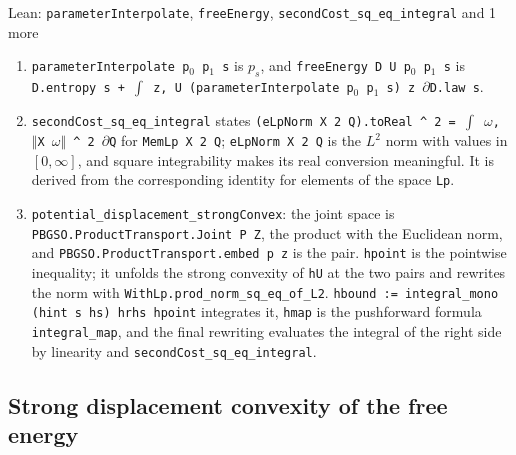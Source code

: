 \documentclass[11pt,a4paper]{report}
\begin{document}
\begin{leanbox}{Lean: \texttt{parameterInterpolate}, \texttt{freeEnergy}, \texttt{secondCost\_\allowbreak{}sq\_\allowbreak{}eq\_\allowbreak{}integral} and 1 more}
\begin{enumerate}
\item \texttt{parameter\allowbreak{}Interpolate p\ensuremath{{}_{0}} p\ensuremath{{}_{1}} s} is \(p_s\), and \texttt{free\allowbreak{}Energy D U p\ensuremath{{}_{0}} p\ensuremath{{}_{1}} s} is \texttt{D.\allowbreak{}entropy s + \ensuremath{\int} z, U (parameter\allowbreak{}Interpolate p\ensuremath{{}_{0}} p\ensuremath{{}_{1}} s) z \ensuremath{\partial}D.\allowbreak{}law s}.

\item \texttt{second\allowbreak{}Cost\_\allowbreak{}sq\_\allowbreak{}eq\_\allowbreak{}integral} states \texttt{(e\allowbreak{}Lp\allowbreak{}Norm X 2 Q).\allowbreak{}to\allowbreak{}Real \textasciicircum{} 2 = \ensuremath{\int} \ensuremath{\omega}, \ensuremath{\Vert}X \ensuremath{\omega}\ensuremath{\Vert} \textasciicircum{} 2 \ensuremath{\partial}Q} for \texttt{Mem\allowbreak{}Lp X 2 Q}; \texttt{e\allowbreak{}Lp\allowbreak{}Norm X 2 Q} is the \(L^2\) norm with values in \([0,\infty]\), and square integrability makes its real conversion meaningful. It is derived from the corresponding identity for elements of the space \texttt{Lp}.

\item \texttt{potential\_\allowbreak{}displacement\_\allowbreak{}strong\allowbreak{}Convex}: the joint space is \texttt{PBGSO.\allowbreak{}Product\allowbreak{}Transport.\allowbreak{}Joint P Z}, the product with the Euclidean norm, and \texttt{PBGSO.\allowbreak{}Product\allowbreak{}Transport.\allowbreak{}embed p z} is the pair. \texttt{hpoint} is the pointwise inequality; it unfolds the strong convexity of \texttt{h\allowbreak{}U} at the two pairs and rewrites the norm with \texttt{With\allowbreak{}Lp.\allowbreak{}prod\_\allowbreak{}norm\_\allowbreak{}sq\_\allowbreak{}eq\_\allowbreak{}of\_\allowbreak{}L2}. \texttt{hbound := integral\_\allowbreak{}mono (hint s hs) hrhs hpoint} integrates it, \texttt{hmap} is the pushforward formula \texttt{integral\_\allowbreak{}map}, and the final rewriting evaluates the integral of the right side by linearity and \texttt{second\allowbreak{}Cost\_\allowbreak{}sq\_\allowbreak{}eq\_\allowbreak{}integral}.

\end{enumerate}
\end{leanbox}
\subsection{\texorpdfstring{Strong displacement convexity of the free energy}{Strong displacement convexity of the free energy}}
\end{document}
